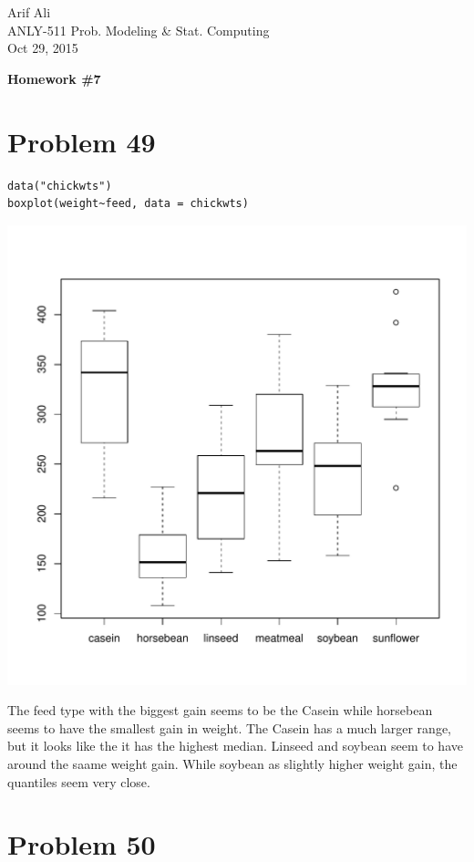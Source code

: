 \documentclass{article}\usepackage[]{graphicx}\usepackage[]{color}
\makeatletter
\newenvironment{kframe}{%
 \def\at@end@of@kframe{}%
 \ifinner\ifhmode%
  \def\at@end@of@kframe{\end{minipage}}%
  \begin{minipage}{\columnwidth}%
 \fi\fi%
 \def\FrameCommand##1{\hskip\@totalleftmargin \hskip-\fboxsep
 \colorbox{shadecolor}{##1}\hskip-\fboxsep
     \hskip-\linewidth \hskip-\@totalleftmargin \hskip\columnwidth}%
 \MakeFramed {\advance\hsize-\width
   \@totalleftmargin\z@ \linewidth\hsize
   \@setminipage}}%
 {\par\unskip\endMakeFramed%
 \at@end@of@kframe}
\newenvironment{knitrout}{}{} %
\makeatother
\begin{document}
\begin{flushright}
  Arif Ali\\
  ANLY-511 Prob. Modeling \& Stat. Computing\\
	Oct 29, 2015\\
\end{flushright}

\begin{center}
  \LARGE\textbf{Homework \#7}
\end{center}
\section*{Problem 49}
\begin{knitrout}
\color{fgcolor}\begin{kframe}
\begin{verbatim}
data("chickwts")
boxplot(weight~feed, data = chickwts)
\end{verbatim}
\end{kframe}
\includegraphics[width=0.33\linewidth]{figure/unnamed-chunk-2-1} 

\end{knitrout}
The feed type with the biggest gain seems to be the Casein while horsebean seems to have the smallest gain in weight. The Casein has a much larger range, but it looks like the it has the highest median. Linseed and soybean seem to have around the saame weight gain. While soybean as slightly higher weight gain, the quantiles seem very close.
\section*{Problem 50}
\end{document}
